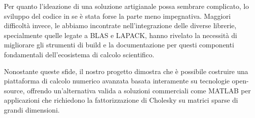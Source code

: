 Per quanto l'ideazione di una soluzione artigianale possa sembrare complicato, lo sviluppo del codice in se è stata forse la parte meno impegnativa.
Maggiori difficoltà invece, le abbiamo incontrate nell'integrazione delle diverse librerie, specialmente quelle legate a BLAS e LAPACK, hanno rivelato 
la necessità di migliorare gli strumenti di build e la documentazione per questi componenti fondamentali dell'ecosistema di 
calcolo scientifico.

Nonostante queste sfide, il nostro progetto dimostra che è possibile costruire una piattaforma di calcolo 
numerico avanzata basata interamente su tecnologie open-source, offrendo un'alternativa valida a soluzioni commerciali come MATLAB per 
applicazioni che richiedono la fattorizzazione di Cholesky su matrici sparse di grandi dimensioni.
